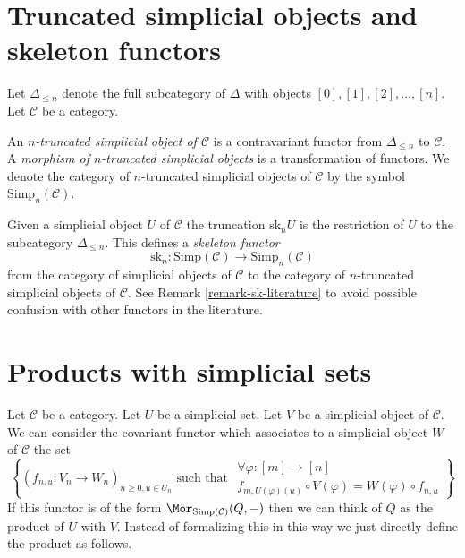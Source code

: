\section{Truncated simplicial objects and skeleton functors}
\label{section-skeleton}

\noindent
Let $\Delta_{\leq n}$ denote the full subcategory of
$\Delta$ with objects $[0], [1], [2], \ldots, [n]$.
Let $\mathcal{C}$ be a category.

\begin{definition}
\label{definition-truncated-simplicial-object}
An {\it $n$-truncated simplicial object of $\mathcal{C}$}
is a contravariant functor from $\Delta_{\leq n}$ to
$\mathcal{C}$. A {\it morphism of $n$-truncated
simplicial objects} is a transformation of functors.
We denote the category of $n$-truncated
simplicial objects of $\mathcal{C}$ by
the symbol $\text{Simp}_n(\mathcal{C})$.
\end{definition}

\noindent
Given a simplicial object $U$ of $\mathcal{C}$
the truncation $\text{sk}_n U$ is the restriction
of $U$ to the subcategory $\Delta_{\leq n}$.
This defines a {\it skeleton functor}
$$
\text{sk}_n :
\text{Simp}(\mathcal{C}) \longrightarrow \text{Simp}_n(\mathcal{C})
$$
from the category of simplicial objects of $\mathcal{C}$
to the category of $n$-truncated simplicial objects of $\mathcal{C}$.
See Remark \ref{remark-sk-literature} to avoid possible confusion
with other functors in the literature.




\section{Products with simplicial sets}
\label{section-product-with-simplicial-sets}

\noindent
Let $\mathcal{C}$ be a category.
Let $U$ be a simplicial set.
Let $V$ be a simplicial object of $\mathcal{C}$.
We can consider the covariant functor which associates
to a simplicial object $W$ of $\mathcal{C}$
the set
\begin{equation}
\label{equation-functor-product-with-simplicial-set}
\left\{
(f_{n, u} : V_n \to W_n)_{n \geq 0, u \in U_n}
\text{ such that }
\begin{matrix}
\forall \varphi : [m] \to [n] \\
f_{m, U(\varphi)(u)} \circ V(\varphi) = W(\varphi) \circ f_{n, u}
\end{matrix}
\right\}
\end{equation}
If this functor is of the form
$\Mor_{\text{Simp}(\mathcal{C})}(Q, -)$
then we can think of $Q$ as the product of $U$ with $V$.
Instead of formalizing this in this way we just directly
define the product as follows.

